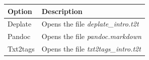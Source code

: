 \begin{scriptsize}
  \begin{tabularx}{\textwidth}{>{\hsize=0.3\hsize}X>{\hsize=0.7\hsize}X}\\
    \hline
    \textbf{Option} & \textbf{Description} \\
    \hline
    Deplate & Opens the file \textit{deplate\_intro.t2t} \\
    Pandoc & Opens the file \textit{pandoc.markdown} \\
    Txt2tags & Opens the file \textit{txt2tags\_intro.t2t} \\
    \hline
  \end{tabularx}
\end{scriptsize}
